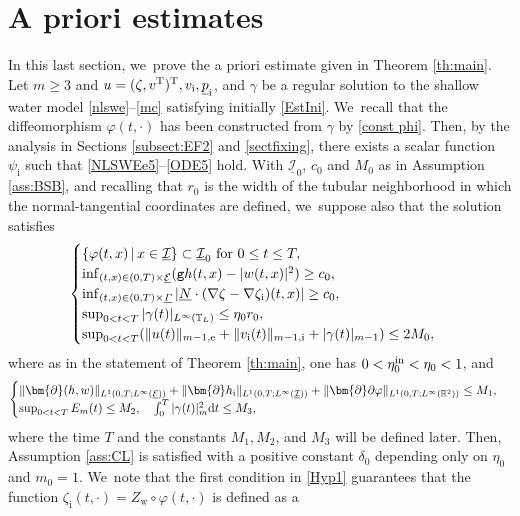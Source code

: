 \documentclass[10pt]{amsart}
\newcommand{\gr}{{\mathtt g}}
\newcommand{\R}{{\mathbb R}}
\newcommand{\cI}{{\mathcal I}}
\newcommand{\cE}{{\mathcal E}}
\newcommand{\ul}[1]{\underline{#1}}
\newcommand{\itGamma}{\mathit{\Gamma}}
\theoremstyle{definition}
\begin{document}
\section{A priori estimates}\label{sect:APE}
In this last section, we~prove the a priori estimate given in Theorem \ref{th:main}.
Let $m\geq 3$ and $u=(\zeta,v^{\rm T})^{\rm T}, v_\mathrm{i}, \ul{p}_\mathrm{i}$, and $\gamma$ be a regular solution
to the shallow water model \eqref{nlswe}--\eqref{mc} satisfying initially \eqref{EstIni}. We~recall that the diffeomorphism $\varphi(t,\cdot)$ has been constructed from $\gamma$ by \eqref{const phi}.
Then, by the analysis in Sections \ref{subsect:EF2} and \ref{sectfixing},
there exists a scalar function $\psi_\mathrm{i}$ such that \eqref{NLSWEe5}--\eqref{ODE5} hold.
With $ \ul{\cI}_0$, $c_0$ and $M_0$ as in Assumption \ref{ass:BSB},
and recalling that $r_0$ is the width of the tubular neighborhood in which the normal-tangential coordinates are defined, we~suppose also that the solution satisfies
\begin{equation}\label{Hyp1}
\begin{cases}
\{ \varphi(t,x) \,|\, x\in\ul{\cI} \} \subset \ul{\cI}_0 \mbox{ for } 0\leq t\leq T, \\
\inf_{(t,x)\in(0,T)\times\ul{\cE}}(\gr h(t,x)-|w(t,x)|^2) \geq c_0, \\
\inf_{(t,x)\in(0,T)\times\ul{\itGamma}}| \ul{N}\cdot(\nabla\zeta-\nabla\zeta_\mathrm{i})(t,x)| \geq c_0, \\
\sup_{0<t<T}|\gamma(t)|_{L^\infty(\mathbb{T}_L)} \leq \eta_0r_0, \\
\sup_{0<t<T}(\|u(t)\|_{m-1,{\rm e}} + \|v_\mathrm{i}(t)\|_{m-1,{\rm i}} + |\gamma(t)|_{m-1}) \leq 2M_0,
\end{cases}
\end{equation}
where as in the statement of Theorem \ref{th:main}, one has $0<\eta_0^{\rm in}<\eta_0<1$, and
\begin{equation}\label{Hyp2}
\begin{cases}
\|\bm{\partial}(h,w)\|_{L^1(0,T;L^\infty(\ul{\cE}))} + \|\bm{\partial} h_\mathrm{i}\|_{L^1(0,T;L^\infty(\ul{\cI}))}
+ \|\bm{\partial}\partial\varphi\|_{L^1(0,T;L^\infty(\R^2))} \leq M_1, \\
\sup_{0<t<T}E_m(t) \leq M_2, \quad \int_0^T|\gamma(t)|_m^2{\rm d}t \leq M_3,
\end{cases}
\end{equation}
where the time $T$ and the constants $M_1, M_2$, and $M_3$ will be defined later.
Then, Assumption \ref{ass:CL} is satisfied with a positive constant $\delta_0$ depending only on $\eta_0$ and $m_0=1$. We~note that the first condition in \eqref{Hyp1} guarantees that the function $\zeta_\mathrm{i}(t,\cdot)=Z_\mathrm{w}\circ\varphi(t,\cdot)$ is defined as a
\end{document}
